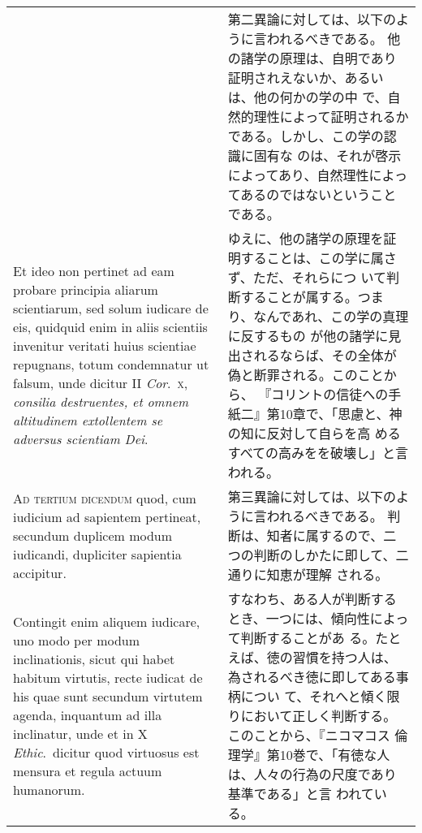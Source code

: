\documentclass[10pt]{jsarticle} %
\begin{document}
\begin{longtable}{p{21em}p{21em}}
&

第二異論に対しては、以下のように言われるべきである。
他の諸学の原理は、自明であり証明されえないか、あるいは、他の何かの学の中
 で、自然的理性によって証明されるかである。しかし、この学の認識に固有な
 のは、それが啓示によってあり、自然理性によってあるのではないということ
 である。

\\

Et ideo non pertinet ad eam probare
principia aliarum scientiarum, sed solum iudicare de eis, quidquid enim
in aliis scientiis invenitur veritati huius scientiae repugnans, totum
condemnatur ut falsum, unde dicitur II {\itshape Cor}.~{\scshape x}, {\itshape consilia destruentes, et
omnem altitudinem extollentem se adversus scientiam Dei}.


&

ゆえに、他の諸学の原理を証明することは、この学に属さず、ただ、それらにつ
 いて判断することが属する。つまり、なんであれ、この学の真理に反するもの
 が他の諸学に見出されるならば、その全体が偽と断罪される。このことから、
 『コリントの信徒への手紙二』第10章で、「思慮と、神の知に反対して自らを高
 めるすべての高みをを破壊し」と言われる。


\\


{\scshape Ad tertium dicendum} quod, cum iudicium ad
sapientem pertineat, secundum duplicem modum iudicandi, dupliciter
sapientia accipitur. 

&

第三異論に対しては、以下のように言われるべきである。
判断は、知者に属するので、二つの判断のしかたに即して、二通りに知恵が理解
 される。


\\

Contingit enim aliquem iudicare, uno modo per modum
inclinationis, sicut qui habet habitum virtutis, recte iudicat de his
quae sunt secundum virtutem agenda, inquantum ad illa inclinatur, unde
et in X {\itshape Ethic}.~dicitur quod virtuosus est mensura et regula actuum
humanorum. 

&

すなわち、ある人が判断するとき、一つには、傾向性によって判断することがあ
 る。たとえば、徳の習慣を持つ人は、為されるべき徳に即してある事柄につい
 て、それへと傾く限りにおいて正しく判断する。このことから、『ニコマコス
 倫理学』第10巻で、「有徳な人は、人々の行為の尺度であり基準である」と言
 われている。


\\


\end{longtable}
\end{document}
